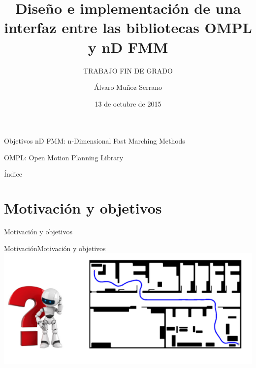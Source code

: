 \documentclass[10pt]{beamer}
\title{Diseño e implementación de una interfaz entre las bibliotecas OMPL y nD FMM \vspace{0.5cm}}
\subtitle{TRABAJO FIN DE GRADO}  %
\date{13 de octubre de 2015}
\author{
Álvaro Muñoz Serrano
}
\institute[
] %
{%
 Departamento de Sistemas y Automática
  
}
\begin{document}
{%
\begin{frame} %
  \titlepage
\end{frame}}

\begin{frame}{Objetivos}
	\large nD FMM: n-Dimensional Fast Marching Methods
	\vspace{1cm}
	
	\large OMPL: Open Motion Planning Library
\end{frame}

\begin{frame}{Índice}{}
\tableofcontents
\end{frame}

\section{Motivación y objetivos}

\begin{frame}
\begin{center}
\vspace{1.5cm}
\huge Motivación y objetivos
\end{center}
\end{frame}

\begin{frame}{Motivación}{Motivación y objetivos}		\includegraphics[width=\textwidth,height=0.8\textheight,keepaspectratio]{dudabot}
\end{frame}
\end{document}
